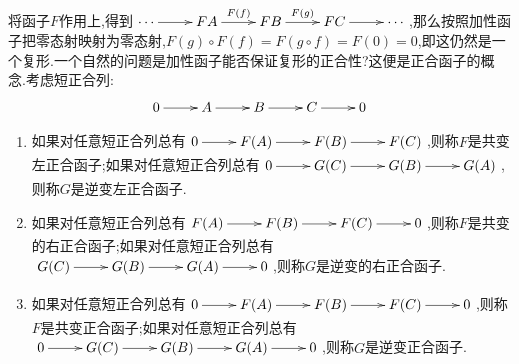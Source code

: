 将函子$F$作用上,得到$\xymatrix{\cdots\ar[r]&FA\ar[r]^{F(f)}&FB\ar[r]^{F(g)}&FC\ar[r]&\cdots}$,那么按照加性函子把零态射映射为零态射,$F(g)\circ F(f)=F(g\circ f)=F(0)=0$,即这仍然是一个复形.一个自然的问题是加性函子能否保证复形的正合性?这便是正合函子的概念.考虑短正合列:
$$\xymatrix{0\ar[r]&A\ar[r]&B\ar[r]&C\ar[r]&0}$$
\begin{enumerate}
	\item 如果对任意短正合列总有$\xymatrix{0\ar[r]&F(A)\ar[r]&F(B)\ar[r]&F(C)}$,则称$F$是共变左正合函子;如果对任意短正合列总有$\xymatrix{0\ar[r]&G(C)\ar[r]&G(B)\ar[r]&G(A)}$,则称$G$是逆变左正合函子.
	\item 如果对任意短正合列总有$\xymatrix{F(A)\ar[r]&F(B)\ar[r]&F(C)\ar[r]&0}$,则称$F$是共变的右正合函子;如果对任意短正合列总有$\xymatrix{G(C)\ar[r]&G(B)\ar[r]&G(A)\ar[r]&0}$,则称$G$是逆变的右正合函子.
	\item 如果对任意短正合列总有$\xymatrix{0\ar[r]&F(A)\ar[r]&F(B)\ar[r]&F(C)\ar[r]&0}$,则称$F$是共变正合函子;如果对任意短正合列总有$\xymatrix{0\ar[r]&G(C)\ar[r]&G(B)\ar[r]&G(A)\ar[r]&0}$,则称$G$是逆变正合函子.
\end{enumerate}

